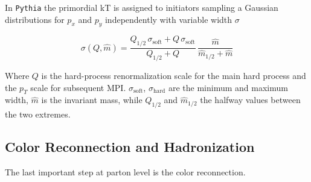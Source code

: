 In \texttt{Pythia} the primordial kT is assigned to initiators sampling a Gaussian distributions for $p_x$ and $p_y$ independently with variable width $\sigma$

\begin{equation}
	\sigma(Q,\widehat{m})=\frac{Q_{1/2}\,\sigma_{\text{soft}}+Q\,\sigma_{\text{soft}}}{Q_{1/2}+Q}\,\frac{\widehat{m}}{\widehat{m}_{1/2}+\widehat{m}}
\end{equation}
 
Where $Q$ is the hard-process renormalization scale for the main hard process and the $p_T$ scale for subsequent MPI. $\sigma_{\text{soft}}$, $\sigma_{\text{hard}}$ are the minimum and maximum width, $\widehat{m}$ is the invariant mass, while $Q_{1/2}$ and $\widehat{m}_{1/2}$ the halfway values between the two extremes.

\subsection{Color Reconnection and Hadronization }

The last important step at parton level is the color reconnection.

